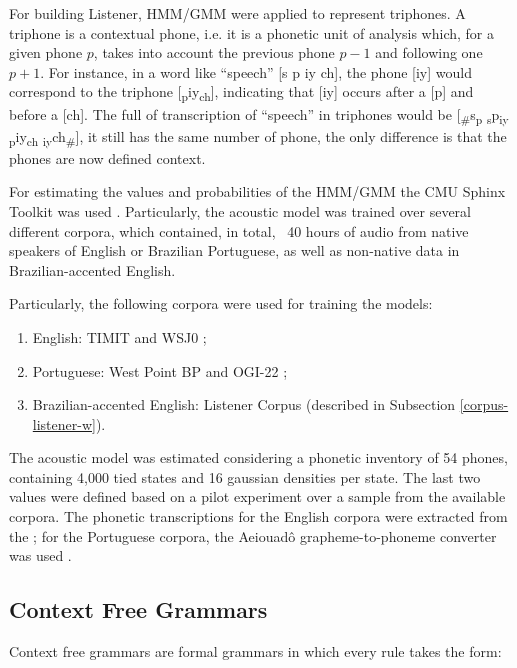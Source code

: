 \documentclass[twocolumn]{bmcart}%
\begin{document}
For building Listener, HMM/GMM were applied to represent triphones. A triphone is a contextual phone, i.e. it is a phonetic unit of analysis which, for a given phone $p$, takes into account the previous phone $p-1$ and following one $p+1$. For instance, in a word like ``speech'' [s p iy ch], the phone [iy] would correspond to the triphone [\textsubscript{p}iy\textsubscript{ch}], indicating that [iy] occurs after a [p] and before a [ch]. The full of transcription of ``speech'' in triphones would be [\textsubscript{\#}s\textsubscript{p} \textsubscript{s}p\textsubscript{iy} \textsubscript{p}iy\textsubscript{ch} \textsubscript{iy}ch\textsubscript{\#}], it still has the same number of phone, the only difference is that the phones are now defined context.

For estimating the values and probabilities of the HMM/GMM the CMU Sphinx Toolkit was used \cite{Walker2004}. 
Particularly, the acoustic model was trained over several different corpora, which contained, in total, ~40 hours of audio from native speakers of English or Brazilian Portuguese, as well as non-native data in Brazilian-accented English. 

Particularly, the following corpora were used for training the models:

\begin{enumerate}
 \item English: TIMIT \cite{Garofolo1993} and WSJ0 \cite{Garofolo2007};
 \item Portuguese: West Point BP \cite{Morgan2008} and OGI-22 \cite{Lander1995};
 \item Brazilian-accented English: Listener Corpus (described in Subsection \ref{corpus-listener-w}).
\end{enumerate}

The acoustic model was estimated considering a phonetic inventory of 54 phones, containing 4,000 tied states and 16 gaussian densities per state. The last two values were defined based on a pilot experiment over a sample from the available corpora. The phonetic transcriptions for the English corpora were extracted from the \cite{CMUDict2008}; for the Portuguese corpora, the Aeiouad\^o grapheme-to-phoneme converter was used \cite{Mendonca2014b}.


\subsection{Context Free Grammars}

Context free grammars are formal grammars in which every rule takes the form:
\end{document}

